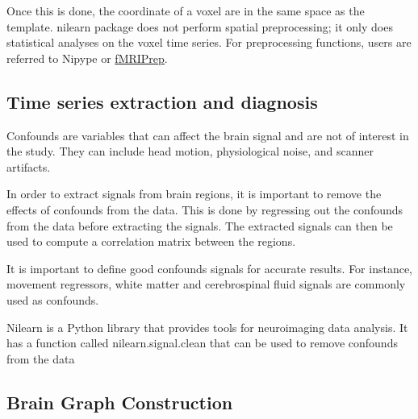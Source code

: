 Once this is done, the coordinate of a voxel are in the same space as the template. nilearn package does not perform spatial preprocessing; it only does statistical analyses on the voxel time series. For preprocessing functions, users are referred to Nipype or \href{https://fmriprep.org/en/stable/}{fMRIPrep}. 

\subsection{Time series extraction and diagnosis}

Confounds are variables that can affect the brain signal and are not of interest in the study. They can include head motion, physiological noise, and scanner artifacts.

In order to extract signals from brain regions, it is important to remove the effects of confounds from the data. This is done by regressing out the confounds from the data before extracting the signals. The extracted signals can then be used to compute a correlation matrix between the regions.

It is important to define good confounds signals for accurate results. For instance, movement regressors, white matter and cerebrospinal fluid signals are commonly used as confounds.

Nilearn is a Python library that provides tools for neuroimaging data analysis. It has a function called nilearn.signal.clean that can be used to remove confounds from the data

\subsection{Brain Graph Construction}